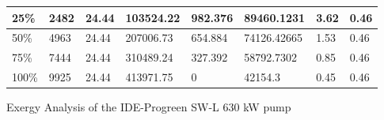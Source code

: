 \begin{table}[h!]
\begin{tabular}{|l|l|l|l|l|l|l|l|}
25\% & 2482 & 24.44 & 103524.22  & 982.376 & 89460.1231   & 3.62
 & 0.46 \\ \hline
50\%  & 4963 & 24.44 &207006.73  & 654.884 & 74126.42665 & 1.53 & 0.46  \\ \hline
75\%   & 7444 & 24.44   &310489.24  & 327.392  & 58792.7302 & 0.85  & 0.46                                                               \\ \hline
100\% & 9925 & 24.44 &  413971.75  & 0  & 42154.3  & 0.45 & 0.46\\ \hline
\end{tabular}
\label{SW-S}
\end{table}



\begin{table}[h!]
\centering
\caption{Exergy Analysis of the IDE-Progreen SW-L 630 kW pump}


\end{table}
